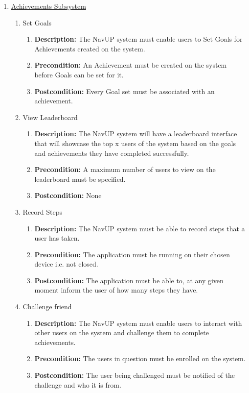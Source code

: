 \documentclass{article}
\begin{document}
\begin{enumerate}
 		\item \underline{Achievements Subsystem}
 		\begin{enumerate}	
			
		\item Set Goals
		\begin{enumerate}
			\item \textbf{Description:} The NavUP system must enable users to Set Goals for Achievements created on the system. 
			\item \textbf{Precondition:} An Achievement must be created on the system before Goals can be set for it. 
			\item \textbf{Postcondition:} Every Goal set must be associated with an achievement. 			
		\end{enumerate}
		
		\item View Leaderboard
		\begin{enumerate}
			\item \textbf{Description:} The NavUP system will have a leaderboard interface that will showcase the top x users of the system based on the goals and achievements they have completed successfully. 
			\item \textbf{Precondition:} A maximum number of users to view on the leaderboard must be specified. 
			\item \textbf{Postcondition:} None			
			
		\end{enumerate}
		
		\item Record Steps
		\begin{enumerate}
			\item \textbf{Description:} The NavUP system must be able to record steps that a user has taken. 
			\item \textbf{Precondition:} The application must be running on their chosen device i.e. not closed.
			\item \textbf{Postcondition:} The application must be able to, at any given moment inform the user of how many steps they have.
			
		\end{enumerate}
		
		\item Challenge friend
		\begin{enumerate}
			\item \textbf{Description:} The NavUP system must enable users to interact with other users on the system and challenge them to complete achievements. 
			\item \textbf{Precondition:} The users in question must be enrolled on the system. 
			\item \textbf{Postcondition:} The user being challenged must be notified of the challenge and who it is from. \newline					
			

\end{enumerate}
\end{enumerate}
\end{enumerate}
\end{document}
